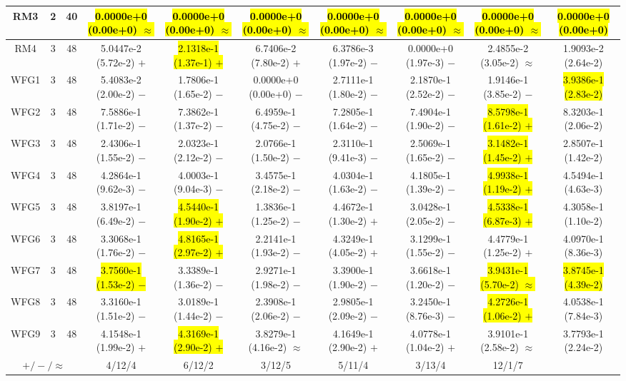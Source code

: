 \documentclass[journal]{IEEEtran}
\begin{document}
\begin{table*}[htbp]
\begin{tabular}{cccccccccc}
\hline
\multirow{1}{*}{RM3}&2&40&\hl{0.0000e+0 (0.00e+0) $\approx$}&\hl{0.0000e+0 (0.00e+0) $\approx$}&\hl{0.0000e+0 (0.00e+0) $\approx$}&\hl{0.0000e+0 (0.00e+0) $\approx$}&\hl{0.0000e+0 (0.00e+0) $\approx$}&\hl{0.0000e+0 (0.00e+0) $\approx$}&\hl{0.0000e+0 (0.00e+0)}\\
\hline
\multirow{1}{*}{RM4}&3&48&5.0447e-2 (5.72e-2) $+$&\hl{2.1318e-1 (1.37e-1) $+$}&6.7406e-2 (7.80e-2) $+$&6.3786e-3 (1.97e-2) $-$&0.0000e+0 (1.97e-3) $-$&2.4855e-2 (3.05e-2) $\approx$&1.9093e-2 (2.64e-2)\\
\hline
\multirow{1}{*}{WFG1}&3&48&5.4083e-2 (2.00e-2) $-$&1.7806e-1 (1.65e-2) $-$&0.0000e+0 (0.00e+0) $-$&2.7111e-1 (1.80e-2) $-$&2.1870e-1 (2.52e-2) $-$&1.9146e-1 (3.85e-2) $-$&\hl{3.9386e-1 (2.83e-2)}\\
\hline
\multirow{1}{*}{WFG2}&3&48&7.5886e-1 (1.71e-2) $-$&7.3862e-1 (1.37e-2) $-$&6.4959e-1 (4.75e-2) $-$&7.2805e-1 (1.64e-2) $-$&7.4904e-1 (1.90e-2) $-$&\hl{8.5798e-1 (1.61e-2) $+$}&8.3203e-1 (2.06e-2)\\
\hline
\multirow{1}{*}{WFG3}&3&48&2.4306e-1 (1.55e-2) $-$&2.0323e-1 (2.12e-2) $-$&2.0766e-1 (1.50e-2) $-$&2.3110e-1 (9.41e-3) $-$&2.5069e-1 (1.65e-2) $-$&\hl{3.1482e-1 (1.45e-2) $+$}&2.8507e-1 (1.42e-2)\\
\hline
\multirow{1}{*}{WFG4}&3&48&4.2864e-1 (9.62e-3) $-$&4.0003e-1 (9.04e-3) $-$&3.4575e-1 (2.18e-2) $-$&4.0304e-1 (1.63e-2) $-$&4.1805e-1 (1.39e-2) $-$&\hl{4.9938e-1 (1.19e-2) $+$}&4.5494e-1 (4.63e-3)\\
\hline
\multirow{1}{*}{WFG5}&3&48&3.8197e-1 (6.49e-2) $-$&\hl{4.5440e-1 (1.90e-2) $+$}&1.3836e-1 (1.25e-2) $-$&4.4672e-1 (1.30e-2) $+$&3.0428e-1 (2.05e-2) $-$&\hl{4.5338e-1 (6.87e-3) $+$}&4.3058e-1 (1.10e-2)\\
\hline
\multirow{1}{*}{WFG6}&3&48&3.3068e-1 (1.76e-2) $-$&\hl{4.8165e-1 (2.97e-2) $+$}&2.2141e-1 (1.93e-2) $-$&4.3249e-1 (4.05e-2) $+$&3.1299e-1 (1.55e-2) $-$&4.4779e-1 (1.25e-2) $+$&4.0970e-1 (8.36e-3)\\
\hline
\multirow{1}{*}{WFG7}&3&48&\hl{3.7560e-1 (1.53e-2) $-$}&3.3389e-1 (1.36e-2) $-$&2.9271e-1 (1.98e-2) $-$&3.3900e-1 (1.90e-2) $-$&3.6618e-1 (1.20e-2) $-$&\hl{3.9431e-1 (5.70e-2) $\approx$}&\hl{3.8745e-1 (4.39e-2)}\\
\hline
\multirow{1}{*}{WFG8}&3&48&3.3160e-1 (1.51e-2) $-$&3.0189e-1 (1.44e-2) $-$&2.3908e-1 (2.06e-2) $-$&2.9805e-1 (2.09e-2) $-$&3.2450e-1 (8.76e-3) $-$&\hl{4.2726e-1 (1.06e-2) $+$}&4.0538e-1 (7.84e-3)\\
\hline
\multirow{1}{*}{WFG9}&3&48&4.1548e-1 (1.99e-2) $+$&\hl{4.3169e-1 (2.90e-2) $+$}&3.8279e-1 (4.16e-2) $\approx$&4.1649e-1 (2.90e-2) $+$&4.0778e-1 (1.04e-2) $+$&3.9101e-1 (2.58e-2) $\approx$&3.7793e-1 (2.24e-2)\\
\hline
\multicolumn{3}{c}{$+/-/\approx$}&4/12/4&6/12/2&3/12/5&5/11/4&3/13/4&12/1/7&\\
\bottomrule
\end{tabular}
\label{No Label}
\end{table*}
\end{document}
